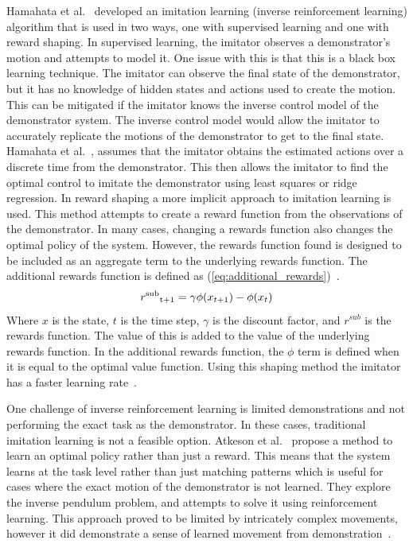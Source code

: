 \documentclass[12pt,american]{report}
\begin{document}
		Hamahata et al.~\cite{hamahata2008effective} developed an imitation learning (inverse reinforcement learning) algorithm that is used in two ways, one with supervised learning and one with reward shaping. In supervised learning, the imitator observes a demonstrator's motion and attempts to model it. One issue with this is that this is a black box learning technique.  The imitator can observe the final state of the demonstrator, but it has no knowledge of hidden states and actions used to create the motion. This can be mitigated if the imitator knows the inverse control model of the demonstrator system. The inverse control model would allow the imitator to accurately replicate the motions of the demonstrator to get to the final state. Hamahata et al.~\cite{hamahata2008effective}, assumes that the imitator obtains the estimated actions over a discrete time from the demonstrator.  This then allows the imitator to find the optimal control to imitate the demonstrator using least squares or ridge regression. In reward shaping a more implicit approach to imitation learning is used. This method attempts to create a reward function from the observations of the demonstrator.  In many cases, changing a rewards function also changes the optimal policy of the system.  However, the rewards function found is designed to be included as an aggregate term to the underlying rewards function. The additional rewards function is defined as (\ref{eq:additional_rewards})~\cite{hamahata2008effective}.
		\begin{equation}
            \label{eq:additional_rewards}
            r\textsuperscript{sub}\textsubscript{t+1}= \gamma\phi(x_{t+1})-\phi(x_{t})
        \end{equation}
		Where $x$ is the state, $t$ is the time step, $\gamma$ is the discount factor, and $r^{sub}$ is the rewards function. The value of this is added to the value of the underlying rewards function. In the additional rewards function, the \textit{$\phi$} term is defined when it is equal to the optimal value function. Using this shaping method the imitator has a faster learning rate~\cite{hamahata2008effective}.
		
		One challenge of inverse reinforcement learning is limited demonstrations and not performing the exact task as the demonstrator. In these cases, traditional imitation learning is not a feasible option. Atkeson et al.~\cite{atkeson1997robot} propose a method to learn an optimal policy rather than just a reward. This means that the system learns at the task level rather than just matching patterns which is useful for cases where the exact motion of the demonstrator is not learned. They explore the inverse pendulum problem, and attempts to solve it using reinforcement learning. This approach proved to be limited by intricately complex movements, however it did demonstrate a sense of learned movement from demonstration~\cite{atkeson1997robot}.
\end{document}
